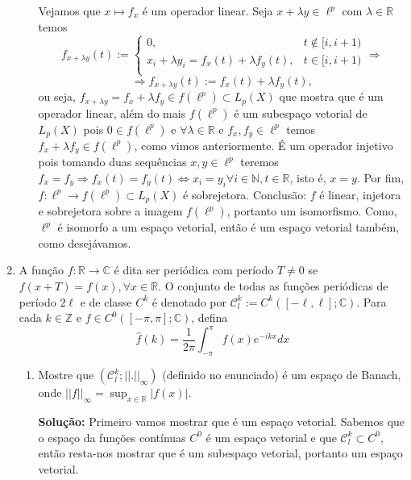 \documentclass{article}
\begin{document}
\begin{enumerate}
\begin{enumerate}
				Vejamos que $x \mapsto f_{x}$ é um operador linear. Seja $x + \lambda y \in \ell^{p}$ com $\lambda \in \mathbb{R}$ temos
				$$
				f_{x + \lambda y }(t) := \left\{
				\begin{array}{cc}
				0, & t \notin [i, i+1)\\
				x_{i} +\lambda y_{i} = f_{x}(t) + \lambda f_{y}(t), & t \in [i, i+1) \\
				\end{array}
				\right. \Rightarrow				
				$$
				$$
				\Rightarrow f_{x + \lambda y }(t) := f_{x}(t) + \lambda f_{y}(t),
				$$
				ou seja, $f_{x + \lambda y } = f_{x} + \lambda f_{y } \in f(\ell^{p}) \subset L_{p}(X)$ que mostra que é um operador linear, além do mais $f(\ell^{p})$ é um subespaço vetorial de $L_{p}(X)$ pois $0 \in f(\ell^{p})$ e $\forall \lambda \in \mathbb{R}$ e $f_{x}, f_{y} \in \ell^{p}$ temos $f_{x} + \lambda f_{y } \in f(\ell^{p})$, como vimos anteriormente. É um operador injetivo pois tomando duas sequências $x, y \in \ell^{p}$ teremos $f_{x} = f_{y} \Rightarrow f_{x}(t) = f_{y}(t) \iff x_{i} = y_{i} \forall i \in \mathbb{N}, t \in \mathbb{R}$, isto é, $x=y$. Por fim, $f: \ell^{p} \to f(\ell^{p}) \subset L_{p}(X)$ é sobrejetora. Conclusão: $f$ é linear, injetora e sobrejetora sobre a imagem $f(\ell^{p})$, portanto um isomorfismo. Como, $\ell^{p}$ é isomorfo a um espaço vetorial, então é um espaço vetorial também, como desejávamos.
				
		\end{enumerate}
		
		
		\item A função $f:\mathbb{R} \to \mathbb{C}$ é dita ser periódica com período $T \neq 0$ se $f(x+T) = f(x), \forall x \in \mathbb{R} $. O conjunto de todas as funções periódicas de período $2\ell$ e de classe $C^{k}$ é denotado por $\mathcal{C}^{k}_{l}:=C^{k}([-\ell, \ell]; \mathbb{C})$. Para cada $k \in \mathbb{Z}$ e $f \in C^{0}([-\pi, \pi]; \mathbb{C})$, defina
		$$
		\hat{f}(k) = \frac{1}{2\pi}\int_{-\pi}^{\pi} f(x)e^{-ikx}dx
		$$
		
		\begin{enumerate}
			\item Mostre que $(\mathcal{C}^{k}_{l}; ||.||_{\infty})$ (definido no enunciado) é um espaço de Banach, onde $||f||_{\infty} = \sup_{x \in \mathbb{R}}|f(x)|$.
			
			\textbf{Solução:} Primeiro vamos mostrar que é um espaço vetorial. Sabemos que o espaço da funções contínuas $C^{0}$ é um espaço vetorial e que $\mathcal{C}^{k}_{l} \subset C^{0}$, então resta-nos mostrar que é um subespaço vetorial, portanto um espaço vetorial.
			

\end{enumerate}
\end{enumerate}
\end{document}
